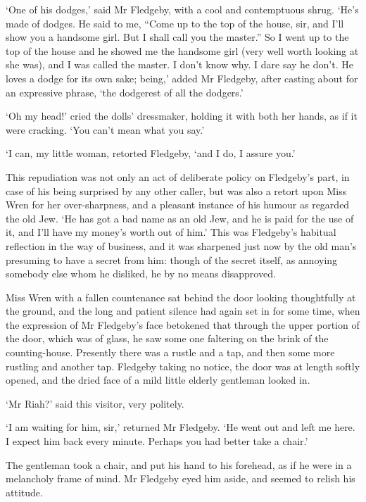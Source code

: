 ‘One of his dodges,’ said Mr Fledgeby, with a cool and contemptuous
shrug. ‘He’s made of dodges. He said to me, “Come up to the top of the
house, sir, and I’ll show you a handsome girl. But I shall call you
the master.” So I went up to the top of the house and he showed me the
handsome girl (very well worth looking at she was), and I was called the
master. I don’t know why. I dare say he don’t. He loves a dodge for
its own sake; being,’ added Mr Fledgeby, after casting about for an
expressive phrase, ‘the dodgerest of all the dodgers.’

‘Oh my head!’ cried the dolls’ dressmaker, holding it with both her
hands, as if it were cracking. ‘You can’t mean what you say.’

‘I can, my little woman, retorted Fledgeby, ‘and I do, I assure you.’

This repudiation was not only an act of deliberate policy on Fledgeby’s
part, in case of his being surprised by any other caller, but was also a
retort upon Miss Wren for her over-sharpness, and a pleasant instance
of his humour as regarded the old Jew. ‘He has got a bad name as an old
Jew, and he is paid for the use of it, and I’ll have my money’s worth
out of him.’ This was Fledgeby’s habitual reflection in the way of
business, and it was sharpened just now by the old man’s presuming
to have a secret from him: though of the secret itself, as annoying
somebody else whom he disliked, he by no means disapproved.

Miss Wren with a fallen countenance sat behind the door looking
thoughtfully at the ground, and the long and patient silence had
again set in for some time, when the expression of Mr Fledgeby’s face
betokened that through the upper portion of the door, which was of
glass, he saw some one faltering on the brink of the counting-house.
Presently there was a rustle and a tap, and then some more rustling and
another tap. Fledgeby taking no notice, the door was at length softly
opened, and the dried face of a mild little elderly gentleman looked in.

‘Mr Riah?’ said this visitor, very politely.

‘I am waiting for him, sir,’ returned Mr Fledgeby. ‘He went out and left
me here. I expect him back every minute. Perhaps you had better take a
chair.’

The gentleman took a chair, and put his hand to his forehead, as if
he were in a melancholy frame of mind. Mr Fledgeby eyed him aside, and
seemed to relish his attitude.

